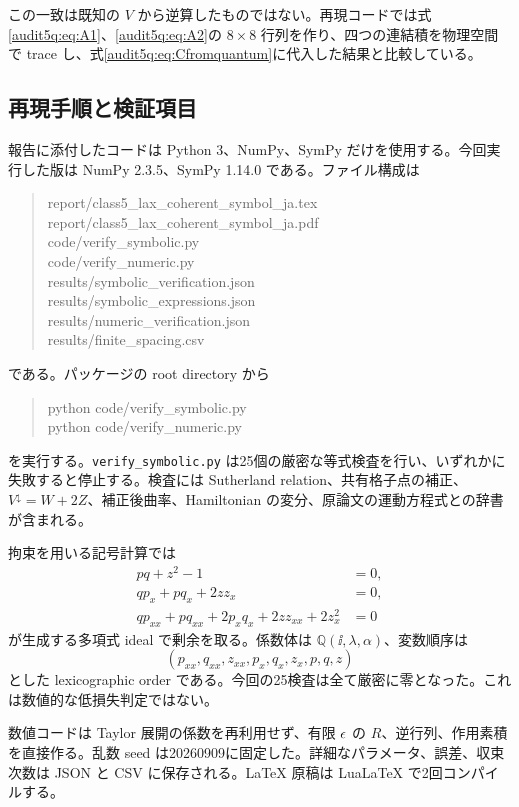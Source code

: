 この一致は既知の $V$ から逆算したものではない。再現コードでは式\eqref{audit5q:eq:A1}、\eqref{audit5q:eq:A2}の $8\times8$ 行列を作り、四つの連結積を物理空間で trace し、式\eqref{audit5q:eq:Cfromquantum}に代入した結果と比較している。

\subsection{再現手順と検証項目}

報告に添付したコードは Python 3、NumPy、SymPy だけを使用する。今回実行した版は NumPy 2.3.5、SymPy 1.14.0 である。ファイル構成は
\begin{quote}\small\ttfamily
report/class5\_lax\_coherent\_symbol\_ja.tex\\
report/class5\_lax\_coherent\_symbol\_ja.pdf\\
code/verify\_symbolic.py\\
code/verify\_numeric.py\\
results/symbolic\_verification.json\\
results/symbolic\_expressions.json\\
results/numeric\_verification.json\\
results/finite\_spacing.csv
\end{quote}
である。パッケージの root directory から
\begin{quote}\small\ttfamily
python code/verify\_symbolic.py\\
python code/verify\_numeric.py
\end{quote}
を実行する。\texttt{verify\_symbolic.py} は25個の厳密な等式検査を行い、いずれかに失敗すると停止する。検査には Sutherland relation、共有格子点の補正、$V^{\downarrow}=W+2Z$、補正後曲率、Hamiltonian の変分、原論文の運動方程式との辞書が含まれる。

拘束を用いる記号計算では
\begin{align}
pq+z^2-1&=0,\\
qp_x+pq_x+2zz_x&=0,\\
qp_{xx}+pq_{xx}+2p_xq_x+2zz_{xx}+2z_x^2&=0
\end{align}
が生成する多項式 ideal で剰余を取る。係数体は $\mathbb Q(\ii,\lambda,\alpha)$、変数順序は
\[
(p_{xx},q_{xx},z_{xx},p_x,q_x,z_x,p,q,z)
\]
とした lexicographic order である。今回の25検査は全て厳密に零となった。これは数値的な低損失判定ではない。

数値コードは Taylor 展開の係数を再利用せず、有限 $\epsilon$ の $R$、逆行列、作用素積を直接作る。乱数 seed は20260909に固定した。詳細なパラメータ、誤差、収束次数は JSON と CSV に保存される。LaTeX 原稿は LuaLaTeX で2回コンパイルする。

\clearpage

